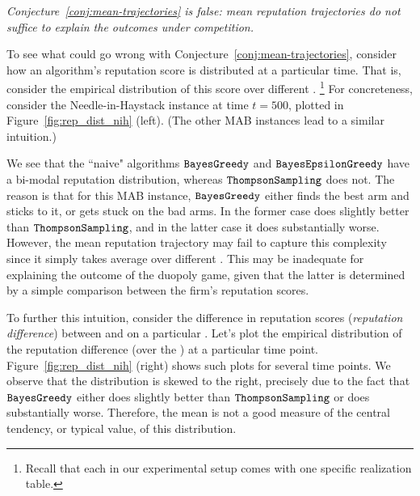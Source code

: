 \documentclass[../competing_bandits_with_appendix.tex]{subfiles}
\begin{document}
\begin{finding}
\textit{
Conjecture~\ref{conj:mean-trajectories} is false: mean reputation trajectories do not suffice to explain the outcomes under competition.}
\end{finding}

To see what could go wrong with Conjecture~\ref{conj:mean-trajectories}, consider how an algorithm's reputation score is distributed at a particular time. That is, consider the empirical distribution of this score over different \MRVs.%
\footnote{Recall that each \MRV in our experimental setup comes with one specific realization table.} For concreteness, consider the Needle-in-Haystack instance at time $t=500$, plotted in Figure~\ref{fig:rep_dist_nih} (left). (The other MAB instances lead to a similar intuition.)

We see that the ``naive" algorithms $\mathtt{BayesGreedy}$ and $\mathtt{BayesEpsilonGreedy}$ have a bi-modal reputation distribution, whereas $\mathtt{ThompsonSampling}$ does not. The reason is that for this MAB instance, $\mathtt{BayesGreedy}$ either finds the best arm and sticks to it, or gets stuck on the bad arms. In the former case \DynamicGreedy does slightly better than $\mathtt{ThompsonSampling}$, and in the latter case it does substantially worse. However, the mean reputation trajectory may fail to capture this complexity since it simply takes average over different \MRVs. This may be inadequate for explaining the outcome of the duopoly game, given that the latter is determined by a simple comparison between the firm's reputation scores.

To further this intuition, consider the difference in reputation scores (\emph{reputation difference}) between \Thompson and \DynamicGreedy on a particular \MRV. Let's plot the empirical distribution of the reputation difference (over the \MRVs) at a particular time point. Figure~\ref{fig:rep_dist_nih} (right) shows such plots for several time points. We observe that the distribution is skewed to the right, precisely due to the fact that $\mathtt{BayesGreedy}$ either does slightly better than $\mathtt{ThompsonSampling}$ or does substantially worse. Therefore, the mean is not a good measure of the central tendency, or typical value, of this distribution.

\end{document}
